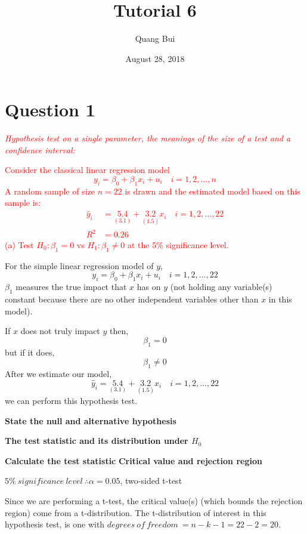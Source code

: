 \documentclass[12pt]{report}
\title{Tutorial 6}
\subtitle
{
\textbf{keywords}: hypothesis testing, t-test, F-test, test statistic, critical value, confidence intervals, R-squared, interpretation of coefficients, multiple linear regression, reparameterisation

\textbf{estimated reading time}: 33 minutes
}
\author{Quang Bui}
\date{August 28, 2018}
\begin{document}
\maketitle

\section*{Question 1}
\noindent \textcolor{red}{\textit{Hypothesis test on a single parameter, the meanings of the size of a test and a confidence interval:}}

\noindent \textcolor{red}{Consider the classical linear regression model $$y_i = \beta_0 + \beta_1 x_i + u_i \quad i=1,2,\dots,n$$ A random sample of size $n=22$ is drawn and the estimated model based on this sample is:
\begin{align*}
	\hat{y}_i &= \underset{(3.1)}{5.4} + \underset{(1.5)}{3.2}x_i \quad i=1,2,\dots,22 \\
	R^2 &= 0.26 
\end{align*} (a) Test $H_0: \beta_1 = 0$ vs $H_1: \beta_1 \neq 0$ at the 5\% significance level.}

\noindent For the simple linear regression model of $y$, $$y_i = \beta_0 + \beta_1 x_i + u_i \quad i=1,2,\dots,22$$ $\beta_1$ measures the true impact that $x$ has on $y$ (not holding any variable(s) constant because there are no other independent variables other than $x$ in this model). 

\noindent If $x$ does not truly impact $y$ then, $$\beta_1 = 0$$ but if it does,  $$\beta_1 \neq 0$$ After we estimate our model, $$\hat{y}_i = \underset{(3.1)}{5.4} + \underset{(1.5)}{3.2}x_i \quad i=1,2,\dots,22$$ we can perform this hypothesis test.

\noindent \textbf{State the null and alternative hypothesis}

\noindent \textbf{The test statistic and its distribution under $H_0$}

\noindent \textbf{Calculate the test statistic}
\noindent \textbf{Critical value and rejection region}

\noindent $5\%\ significance\ level\ \therefore \alpha = 0.05$, two-sided t-test

\noindent Since we are performing a t-test, the critical value(s) (which bounds the rejection region) come from a t-distribution. The t-distribution of interest in this hypothesis test, is one with $degrees\ of\ freedom\ = n - k - 1 = 22 - 2 = 20$. 
\end{document}
